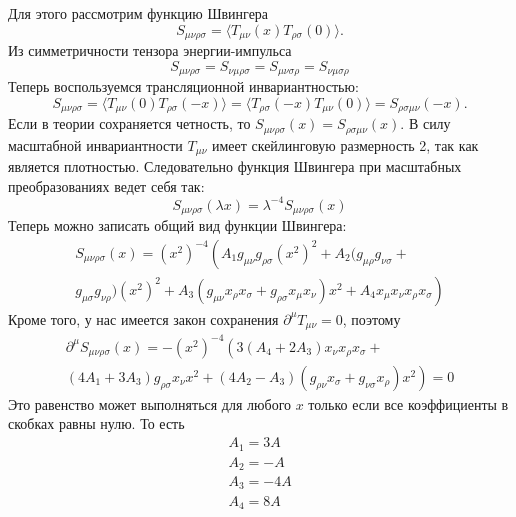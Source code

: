 \documentclass[a4paper,12pt]{article}
\theoremstyle{definition}
\theoremstyle{definition}
\theoremstyle{definition}
\begin{document}
Для этого рассмотрим функцию Швингера
\begin{equation}
  \label{eq:214}
  S_{\mu\nu\rho\sigma}=\langle T_{\mu\nu}(x) T_{\rho\sigma}(0)\rangle.
\end{equation}
Из симметричности тензора энергии-импульса
\begin{equation}
  \label{eq:215}
  S_{\mu\nu\rho\sigma}=S_{\nu\mu\rho\sigma}=S_{\mu\nu\sigma\rho}=S_{\nu\mu\sigma\rho}
\end{equation}
Теперь воспользуемся трансляционной инвариантностью:
\begin{equation}
  \label{eq:216}
  S_{\mu\nu\rho\sigma}=\langle T_{\mu\nu}(0)T_{\rho\sigma}(-x)\rangle =\langle T_{\rho\sigma}(-x) T_{\mu\nu}(0)\rangle = S_{\rho\sigma\mu\nu}(-x).
\end{equation}
Если в теории сохраняется четность, то $S_{\mu\nu\rho\sigma}(x)=S_{\rho\sigma\mu\nu}(x)$. В силу масштабной инвариантности $T_{\mu\nu}$ имеет скейлинговую размерность 2, так как является плотностью. Следовательно функция Швингера при масштабных преобразованиях ведет себя так:
\begin{equation}
  \label{eq:217}
  S_{\mu\nu\rho\sigma}(\lambda x)=\lambda^{-4} S_{\mu\nu\rho\sigma}(x)
\end{equation}
Теперь можно записать общий вид функции Швингера:
\begin{multline}
  \label{eq:218}
  S_{\mu\nu\rho\sigma}(x)=(x^{2})^{-4} \left( A_{1}g_{\mu\nu} g_{\rho\sigma} (x^{2})^{2} + A_{2} (g_{\mu\rho}g_{\nu\sigma}\right. +\\
  \left. g_{\mu\sigma}g_{\nu\rho}) (x^{2})^{2} +A_{3} (g_{\mu\nu} x_{\rho}x_{\sigma} +g_{\rho\sigma}x_{\mu}x_{\nu})x^{2} +A_{4} x_{\mu}x_{\nu}x_{\rho}x_{\sigma}\right)
\end{multline}
Кроме того, у нас имеется закон сохранения $\partial^{\mu} T_{\mu\nu}=0$, поэтому
\begin{multline}
  \label{eq:219}
  \partial^{\mu}  S_{\mu\nu\rho\sigma}(x)=-(x^{2})^{-4} \left( 3(A_{4}+2 A_{3}) x_{\nu}x_{\rho}x_{\sigma}\right. +\\
  \left. (4 A_{1}+3 A_{3}) g_{\rho\sigma} x_{\nu} x^{2} +(4 A_{2} - A_{3}) (g_{\rho\nu}x_{\sigma}+g_{\nu\sigma}x_{\rho}) x^{2}\right)=0
\end{multline}
Это равенство может выполняться для любого $x$ только если все коэффициенты в скобках равны нулю. То есть
\begin{eqnarray}
  \label{eq:220}
  A_{1}=3 A\\
  A_{2}=-A\\
  A_{3}=-4 A\\
  A_{4}=8 A
\end{eqnarray}
\end{document}
